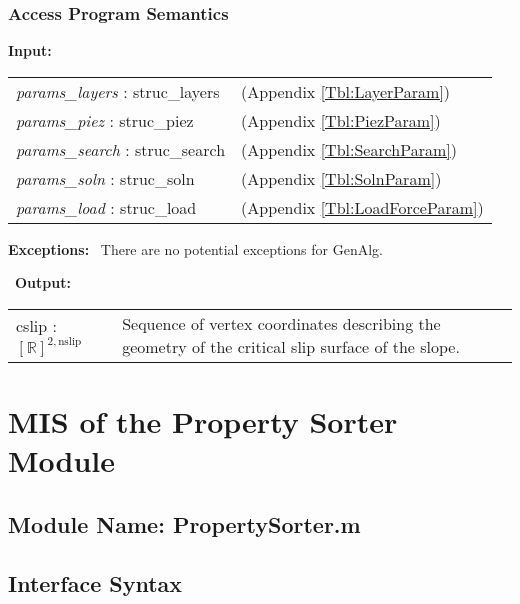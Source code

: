 \documentclass[12pt, titlepage]{article}
\begin{document}
\subsubsection{Access Program Semantics}
\textbf{Input:} 
\renewcommand*{\arraystretch}{1.5}
\begin{longtable}{p{} p{}}
\textit{params\_layers} : struc\_layers & (Appendix \ref{Tbl:LayerParam})\\

\textit{params\_piez} : struc\_piez & (Appendix \ref{Tbl:PiezParam})\\

\textit{params\_search} : struc\_search & (Appendix
\ref{Tbl:SearchParam})\\

\textit{params\_soln} : struc\_soln & (Appendix
\ref{Tbl:SolnParam})\\

\textit{params\_load} : struc\_load & (Appendix
\ref{Tbl:LoadForceParam})\\
\end{longtable}

\noindent \textbf{Exceptions:} ~\newline\noindent There are
no potential exceptions for GenAlg.

~\newline\noindent \textbf{Output:}
\begin{longtable}{p{} p{}}
  cslip : $[\mathbb{R}]^{2,\text{nslip}}$ & Sequence of vertex
  coordinates describing the geometry of the critical slip surface of
  the slope.
\end{longtable}


\section{MIS of the Property Sorter Module} \label{sec:PropSortMod}

\subsection{Module Name: PropertySorter.m}

\subsection{Interface Syntax}
\end{document}
